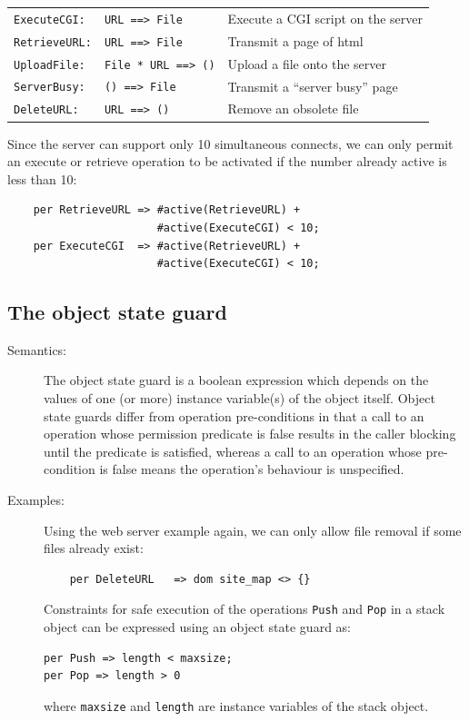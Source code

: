 \documentclass{overturerepchap}
\begin{document}
{\begin{description}
\begin{tabular}{lll}
\texttt{ExecuteCGI:} & \texttt{URL ==> File} & Execute a CGI script on the server\\
\texttt{RetrieveURL:} & \texttt{URL ==> File} & Transmit a page of html\\
\texttt{UploadFile:} & \texttt{File * URL ==> ()} & Upload a file onto the server\\
\texttt{ServerBusy:} & \texttt{() ==> File} & Transmit a ``server busy'' page\\
\texttt{DeleteURL:} & \texttt{URL ==> ()} & Remove an obsolete file
\end{tabular}

Since the server can support only 10 simultaneous connects, we can
only permit an execute or retrieve operation to be activated if the
number already active is less than 10:
\begin{lstlisting}
    per RetrieveURL => #active(RetrieveURL) +
                       #active(ExecuteCGI) < 10;
    per ExecuteCGI  => #active(RetrieveURL) +
                       #active(ExecuteCGI) < 10;
\end{lstlisting}
\end{description}

\subsection{The object state guard}
\begin{description}
\item[Semantics:]
The object state guard is a boolean expression which depends on the values of
one (or more) instance variable(s) of the object itself. Object state
guards differ from operation pre-conditions in that a call to an
operation whose permission predicate is false results in the caller
blocking until the predicate is satisfied, whereas a call to an
operation whose pre-condition is false means the operation's behaviour
is unspecified.

\item[Examples:]
Using the web server example again, we can only allow file removal if
some files already exist:
\begin{lstlisting}
    per DeleteURL   => dom site_map <> {}
\end{lstlisting}

Constraints for safe execution of the operations {\tt Push} and {\tt Pop}
in a stack object can be expressed using an object state guard as:
\begin{lstlisting}
per Push => length < maxsize;
per Pop => length > 0
\end{lstlisting}
where {\tt maxsize} and {\tt length} are instance variables of
the stack object.


\end{description}}
\end{document}
